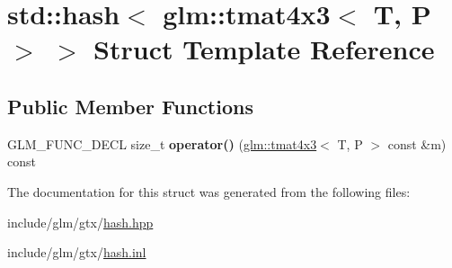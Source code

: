 \hypertarget{structstd_1_1hash_3_01glm_1_1tmat4x3_3_01T_00_01P_01_4_01_4}{}\section{std\+:\+:hash$<$ glm\+:\+:tmat4x3$<$ T, P $>$ $>$ Struct Template Reference}
\label{structstd_1_1hash_3_01glm_1_1tmat4x3_3_01T_00_01P_01_4_01_4}
\subsection*{Public Member Functions}
\begin{DoxyCompactItemize}
\item 
\mbox{\label{structstd_1_1hash_3_01glm_1_1tmat4x3_3_01T_00_01P_01_4_01_4_a45b26e988d064c3a639d7f502065f54c}} 
G\+L\+M\+\_\+\+F\+U\+N\+C\+\_\+\+D\+E\+CL size\+\_\+t {\bfseries operator()} (\hyperlink{structglm_1_1tmat4x3}{glm\+::tmat4x3}$<$ T, P $>$ const \&m) const
\end{DoxyCompactItemize}


The documentation for this struct was generated from the following files\+:\begin{DoxyCompactItemize}
\item 
include/glm/gtx/\hyperlink{hash_8hpp}{hash.\+hpp}\item 
include/glm/gtx/\hyperlink{hash_8inl}{hash.\+inl}\end{DoxyCompactItemize}
